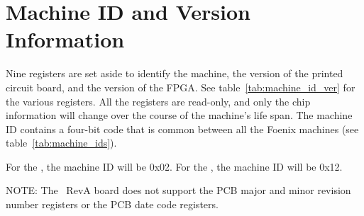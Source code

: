 \section*{Machine ID and Version Information}

Nine registers are set aside to identify the machine, the version of the printed circuit board, and the version of the FPGA. See table~\ref{tab:machine_id_ver} for the various registers. All the registers are read-only, and only the chip information will change over the course of the machine's life span. The machine ID contains a four-bit code that is common between all the Foenix machines (see table~\ref{tab:machine_ids}).

For the \jr, the machine ID will be 0x02. For the \fk, the machine ID will be 0x12.

\begin{leftbar}
	NOTE: The \jr\ RevA board does not support the PCB major and minor revision number registers or the PCB date code registers.
\end{leftbar}

